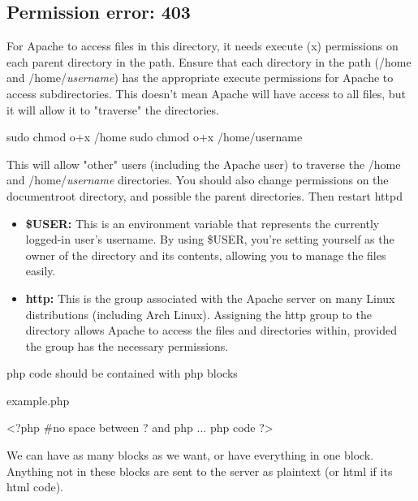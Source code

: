 \documentclass{report}
\begin{document}
    \bigbreak \noindent 
    \subsection{Permission error: 403}
    \bigbreak \noindent 
    For Apache to access files in this directory, it needs execute (x) permissions on each parent directory in the path.
    \bigbreak \noindent 
    Ensure that each directory in the path (/home and /home/\textit{username}) has the appropriate execute permissions for Apache to access subdirectories. This doesn't mean Apache will have access to all files, but it will allow it to "traverse" the directories.
    \bigbreak \noindent 
    \begin{bashcode}
        sudo chmod o+x /home
        sudo chmod o+x /home/username
    \end{bashcode}
    \bigbreak \noindent 
    This will allow "other" users (including the Apache user) to traverse the /home and /home/\textit{username} directories.
    \bigbreak \noindent 
    You should also change permissions on the documentroot directory, and possible the parent directories. Then restart httpd
    \bigbreak \noindent 
    \begin{itemize}
        \item \textbf{\$USER:} This is an environment variable that represents the currently logged-in user's username. By using \$USER, you’re setting yourself as the owner of the directory and its contents, allowing you to manage the files easily.
        \item \textbf{http:} This is the group associated with the Apache server on many Linux distributions (including Arch Linux). Assigning the http group to the directory allows Apache to access the files and directories within, provided the group has the necessary permissions.
    \end{itemize}



    \pagebreak 
    \bigbreak \noindent 
    php code should be contained with php blocks
    \bigbreak \noindent 
    \begin{phpcode}
    example.php

    <?php #no space between ? and php
        ... php code
    ?>
    \end{phpcode}
    \bigbreak \noindent 
    We can have as many blocks as we want, or have everything in one block. Anything not in these blocks are sent to the server as plaintext (or html if its html code).
\end{document}
